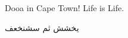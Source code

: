 \documentclass[10pt,a4paper]{article}
\author{Doaa}
\begin{document}

Dooa in Cape Town! Life is Life.

\begin{otherlanguage}{arabic}
يخشش ثم سشنخعف
\end{otherlanguage}
\end{document}
